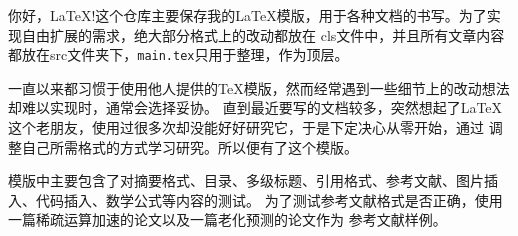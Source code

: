 你好，\LaTeX!这个仓库主要保存我的\LaTeX 模版，用于各种文档的书写。为了实现自由扩展的需求，绝大部分格式上的改动都放在
cls文件中，并且所有文章内容都放在src文件夹下，\verb!main.tex!只用于整理，作为顶层。

一直以来都习惯于使用他人提供的\TeX 模版，然而经常遇到一些细节上的改动想法却难以实现时，通常会选择妥协。
直到最近要写的文档较多，突然想起了\LaTeX 这个老朋友，使用过很多次却没能好好研究它，于是下定决心从零开始，通过
调整自己所需格式的方式学习研究。所以便有了这个模版。

模版中主要包含了对摘要格式、目录、多级标题、引用格式、参考文献、图片插入、代码插入、数学公式等内容的测试。
为了测试参考文献格式是否正确，使用一篇稀疏运算加速的论文以及一篇老化预测的论文作为
参考文献样例。